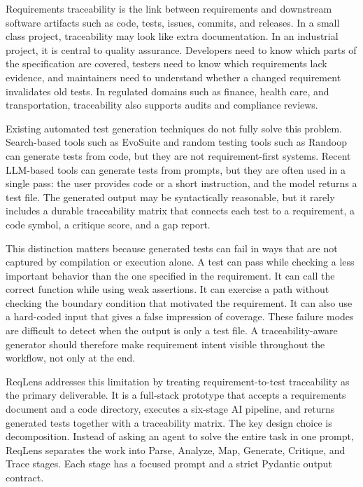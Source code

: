 \documentclass[conference]{IEEEtran}
\begin{document}
Requirements traceability is the link between requirements and downstream
software artifacts such as code, tests, issues, commits, and releases. In a
small class project, traceability may look like extra documentation. In an
industrial project, it is central to quality assurance. Developers need to know
which parts of the specification are covered, testers need to know which
requirements lack evidence, and maintainers need to understand whether a
changed requirement invalidates old tests. In regulated domains such as finance,
health care, and transportation, traceability also supports audits and
compliance reviews.

Existing automated test generation techniques do not fully solve this problem.
Search-based tools such as EvoSuite and random testing tools such as Randoop
can generate tests from code, but they are not requirement-first systems.
Recent LLM-based tools can generate tests from prompts, but they are often used
in a single pass: the user provides code or a short instruction, and the model
returns a test file. The generated output may be syntactically reasonable, but
it rarely includes a durable traceability matrix that connects each test to a
requirement, a code symbol, a critique score, and a gap report.

This distinction matters because generated tests can fail in ways that are not
captured by compilation or execution alone. A test can pass while checking a
less important behavior than the one specified in the requirement. It can call
the correct function while using weak assertions. It can exercise a path
without checking the boundary condition that motivated the requirement. It can
also use a hard-coded input that gives a false impression of coverage. These
failure modes are difficult to detect when the output is only a test file. A
traceability-aware generator should therefore make requirement intent visible
throughout the workflow, not only at the end.

ReqLens addresses this limitation by treating requirement-to-test traceability
as the primary deliverable. It is a full-stack prototype that accepts a
requirements document and a code directory, executes a six-stage AI pipeline,
and returns generated tests together with a traceability matrix. The key design
choice is decomposition. Instead of asking an agent to solve the entire task in
one prompt, ReqLens separates the work into Parse, Analyze, Map, Generate,
Critique, and Trace stages. Each stage has a focused prompt and a strict
Pydantic output contract.
\end{document}
